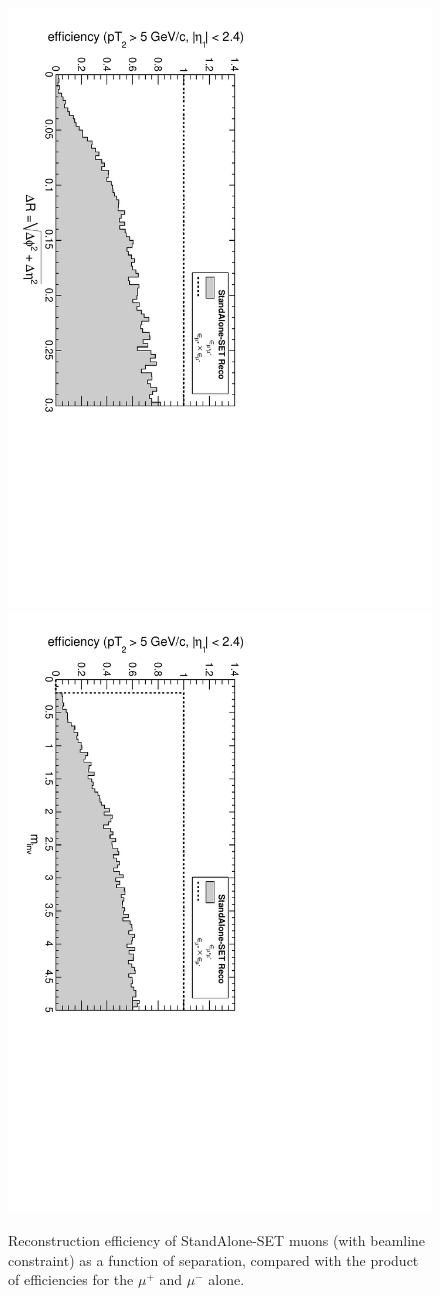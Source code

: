 \documentclass[12pt]{article}
\begin{document}
\begin{figure}[p]
\includegraphics[height=0.5\linewidth, angle=90]{fig/acceptance6_plot/vsdR_StandAloneUpdatedSET.pdf}
\includegraphics[height=0.5\linewidth, angle=90]{fig/acceptance6_plot/vsmass_StandAloneUpdatedSET.pdf}

\caption{Reconstruction efficiency of StandAlone-SET muons (with beamline constraint) as a function of
  separation, compared with the product of efficiencies for the
  $\mu^+$ and $\mu^-$ alone. \label{fig:vseverything_StandAloneUpdatedSET}}
\end{figure}
\end{document}
